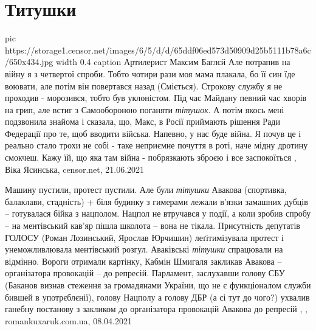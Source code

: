  
 
 
 
 
\chapter{Титушки}
\label{sec:slova.titushka}

\ifcmt
  pic https://storage1.censor.net/images/6/5/d/d/65ddf06ed573d50909d25b5111b78a6c/650x434.jpg
	width 0.4
	caption Артилерист Максим Баглєй
\fi
Але потрапив на війну я з четвертої спроби. Тобто чотири рази моя мама плакала,
бо її син їде воювати, але потім він повертався назад (Сміється). Строкову
службу я не проходив - морозився, тобто був уклоністом. Під час Майдану певний
час хворів на грип, але встиг з Самообороною поганяти \emph{тітушок}. А потім якось
мені подзвонила знайома і сказала, що, Макс, в Росії приймають рішення Ради
Федерації про те, щоб вводити війська. Напевно, у нас буде війна. Я почув це і
реально стало трохи не собі - таке неприємне почуття в роті, наче мідну дротину
смокчеш. Кажу їй, що яка там війна - побрязкають зброєю і все заспокоїться
, 
Віка Ясинська, censor.net, 21.06.2021

Машину пустили, протест пустили.  Але були \emph{тітушки} Авакова (спортивка,
балаклави, стадність) + біля будинку з гимерами лежали в'язки замашних дубців
-- готувалася бійка з нацполом.  Нацпол не втручався у події, а коли зробив
спробу -- на ментівський кав'яр пішла школота -- вона не тікала.  Присутність
депутатів ГОЛОСУ (Роман Лозинський, Ярослав Юрчишин) леґітимізувала протест і
унеможливлювала ментівський розгул.  Аваківські \emph{тітушки} спрацювали на відмінно.
Вороги отримали картінку, Кабмін Шмигаля закликав Авакова -- організатора
провокацій -- до репресій. Парламент, заслухавши голову СБУ (Баканов визнав
стеження за громадянами України, що не є функціоналом служби бившей в
употрєблєнії), голову Нацполу а голову ДБР (а сі тут до чого?) ухвалив ганебну
постанову з закликом до організатора провокацій Авакова до репресій
, , romankuxaruk.com.ua, 08.04.2021

